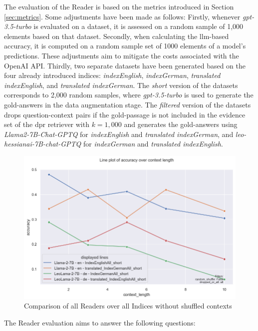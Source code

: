 The evaluation of the Reader is based on the metrics introduced in Section \ref{sec:metrics}. Some adjustments have been made as follows: Firstly, whenever \textit{gpt-3.5-turbo} is evaluated on a dataset, it is assessed on a random sample of 1,000 elements based on that dataset. Secondly, when calculating the \gls{llm}-based accuracy, it is computed on a random sample set of 1000 elements of a model's predictions. These adjustments aim to mitigate the costs associated with the OpenAI API. Thirdly, two separate datasets have been generated based on the four already introduced indices: \textit{indexEnglish}, \textit{indexGerman}, \textit{translated indexEnglish}, and \textit{translated indexGerman}. The \textit{short} version of the datasets corresponds to 2,000 random samples, where \textit{gpt-3.5-turbo} is used to generate the gold-answers in the data augmentation stage. The \textit{filtered} version of the datasets drops question-context pairs if the gold-passage is not included in the evidence set of the \gls{dpr} retriever with $k = 1,000$ and generates the gold-answers using \textit{Llama2-7B-Chat-GPTQ} for \textit{indexEnglish} and \textit{translated indexGerman}, and \textit{leo-hessianai-7B-chat-GPTQ} for \textit{indexGerman} and \textit{translated indexEnglish}.

\begin{figure}
    \centering
    \includegraphics[width=\textwidth]{Grafiken/Evaluation/Reader/all_indices_all_readers_no_shuffle.png}
    \caption{Comparison of all Readers over all Indices without shuffled contexts}
    \label{fig:reader-all-overview-performance}
\end{figure}

The Reader evaluation aims to answer the following questions:

